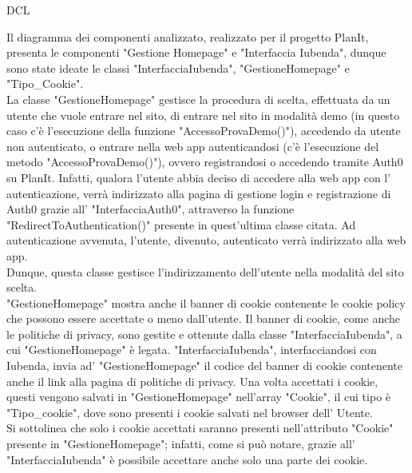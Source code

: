 \begin{listaPersonale}{DCL}
    \begin{center}
        
    \end{center}
    \newpage



    Il diagramma dei componenti analizzato, realizzato per il progetto PlanIt, presenta le componenti "Gestione Homepage" e "Interfaccia Iubenda", dunque sono state ideate le classi "InterfacciaIubenda", "GestioneHomepage" e "Tipo\_Cookie".\\
    La classe "GestioneHomepage" gestisce la procedura di scelta, effettuata da un utente che vuole entrare nel sito, di entrare nel sito in modalità demo (in questo caso c'è l'esecuzione della funzione "AccessoProvaDemo()"), accedendo da utente non autenticato, o entrare nella web app autenticandosi (c'è l'esecuzione del metodo "AccessoProvaDemo()"), ovvero registrandosi o accedendo tramite Auth0 su PlanIt. Infatti, qualora l'utente abbia deciso di accedere alla web app con l' autenticazione, verrà indirizzato alla pagina di gestione login e registrazione di Auth0 grazie all' "InterfacciaAuth0", attraverso la funzione "RedirectToAuthentication()" presente in quest'ultima classe citata. Ad autenticazione avvenuta, l'utente, divenuto, autenticato verrà indirizzato alla web app. \\
    Dunque, questa classe gestisce l'indirizzamento dell'utente nella modalità del sito scelta. \\ "GestioneHomepage" mostra anche il banner di cookie contenente le cookie policy che possono essere accettate o meno dall'utente. Il banner di cookie, come anche le politiche di privacy, sono gestite e ottenute dalla classe "InterfacciaIubenda", a cui "GestioneHomepage" è legata. "InterfacciaIubenda", interfacciandosi con Iubenda, invia ad' "GestioneHomepage" il codice del banner di cookie contenente anche il link alla pagina di politiche di privacy. Una volta accettati i cookie, questi vengono salvati in "GestioneHomepage" nell'array "Cookie", il cui tipo è "Tipo\_cookie", dove sono presenti i cookie salvati nel browser dell' Utente.\\
    Si sottolinea che solo i cookie accettati saranno presenti nell'attributo "Cookie" presente in "GestioneHomepage"; infatti, come si può notare, grazie all' "InterfacciaIubenda" è possibile accettare anche solo una parte dei cookie.



\end{listaPersonale}
